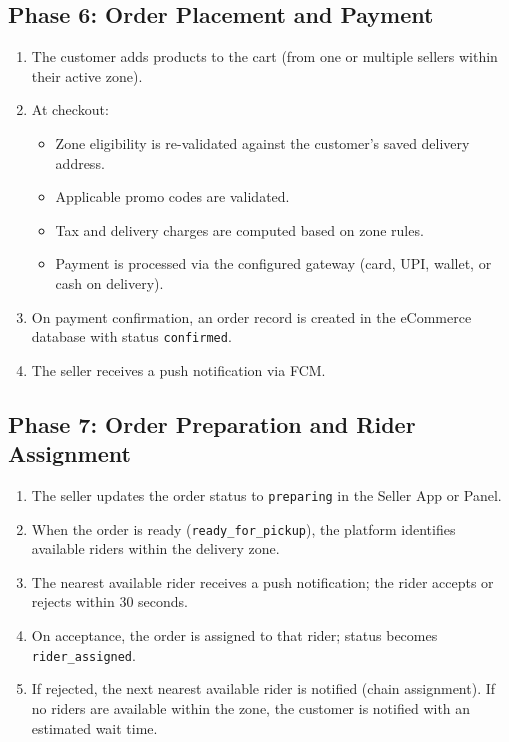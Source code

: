 \documentclass[12pt, a4paper, oneside]{report}
\begin{document}
\subsection{Phase 6: Order Placement and Payment}

\begin{enumerate}
  \item The customer adds products to the cart (from one or multiple sellers
        within their active zone).
  \item At checkout:
    \begin{itemize}
      \item Zone eligibility is re-validated against the customer's saved
            delivery address.
      \item Applicable promo codes are validated.
      \item Tax and delivery charges are computed based on zone rules.
      \item Payment is processed via the configured gateway
            (card, UPI, wallet, or cash on delivery).
    \end{itemize}
  \item On payment confirmation, an order record is created in the eCommerce
        database with status \texttt{confirmed}.
  \item The seller receives a push notification via FCM.
\end{enumerate}

\subsection{Phase 7: Order Preparation and Rider Assignment}

\begin{enumerate}
  \item The seller updates the order status to \texttt{preparing} in the Seller
        App or Panel.
  \item When the order is ready (\texttt{ready\_for\_pickup}), the platform
        identifies available riders within the delivery zone.
  \item The nearest available rider receives a push notification; the rider
        accepts or rejects within 30 seconds.
  \item On acceptance, the order is assigned to that rider; status becomes
        \texttt{rider\_assigned}.
  \item If rejected, the next nearest available rider is notified (chain
        assignment). If no riders are available within the zone, the customer
        is notified with an estimated wait time.
\end{enumerate}
\end{document}
